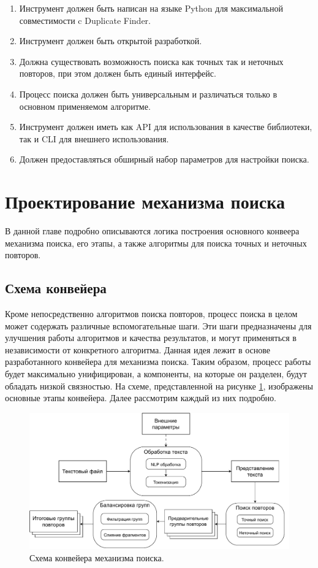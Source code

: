 \documentclass[14pt]{matmex-diploma-custom}
\begin{document}
\begin{enumerate}
	\item Инструмент должен быть написан на языке Python для максимальной совместимости c Duplicate Finder.
	\item Инструмент должен быть открытой разработкой.
	\item Должна существовать возможность поиска как точных так и неточных повторов, при этом должен быть единый интерфейс.
	\item Процесс поиска должен быть универсальным и различаться только в основном применяемом алгоритме.
	\item Инструмент должен иметь как API для использования в качестве библиотеки, так и CLI для внешнего использования.
	\item Должен предоставляться обширный набор параметров для настройки поиска.
\end{enumerate}

\section{Проектирование механизма поиска}
В данной главе подробно описываются логика построения основного конвеера механизма поиска, его этапы, а также алгоритмы для поиска точных и неточных повторов.

\subsection{Схема конвейера}

Кроме непосредственно алгоритмов поиска повторов, процесс поиска в целом может содержать различные вспомогательные шаги. Эти шаги предназначены для улучшения работы алгоритмов и качества результатов, и могут применяться в независимости от конкретного алгоритма. Данная идея лежит в основе разработанного конвейера для механизма поиска. Таким образом, процесс работы будет максимально унифицирован, а компоненты, на которые он разделен, будут обладать низкой связностью. На схеме, представленной на рисунке \ref{fig:Pipeline}, изображены основные этапы конвейера. Далее рассмотрим каждый из них подробно.

\begin{figure}[h!]
	\includegraphics[scale=0.62]{pictures/Pipeline.pdf}
	\centering
	\caption{Схема конвейера механизма поиска.}
	\label{fig:Pipeline}
\end{figure}
\end{document}
